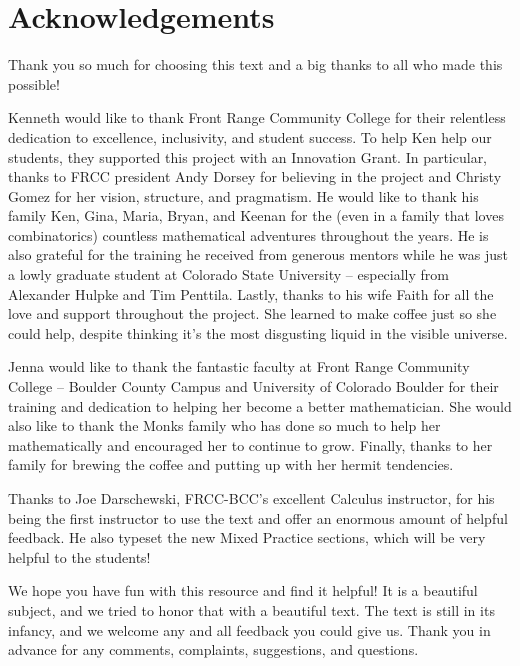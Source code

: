 

\chapter*{Acknowledgements}
\thispagestyle{empty}

Thank you so much for choosing this text and a big thanks to all who made this possible!

Kenneth would like to thank Front Range Community College for their relentless dedication to excellence, inclusivity, and student success. To help Ken help our students, they supported this project with an Innovation Grant. In particular, thanks to FRCC president Andy Dorsey for believing in the project and Christy Gomez for her vision, structure, and pragmatism.  He would like to thank his family Ken, Gina, Maria, Bryan, and Keenan for the (even in a family that loves combinatorics) countless mathematical adventures throughout the years.  He is also grateful for the training he received from generous mentors while he was just a lowly graduate student at Colorado State University -- especially from Alexander Hulpke and Tim Penttila.  Lastly, thanks to his wife Faith for all the love and support throughout the project. She learned to make coffee just so she could help, despite thinking it's the most disgusting liquid in the visible universe.  

Jenna would like to thank the fantastic faculty at Front Range Community College -- Boulder County Campus and University of Colorado Boulder for their training and dedication to helping her become a better mathematician.
She would also like to thank the Monks family who has done so much to help her mathematically and encouraged her to continue to grow.
Finally, thanks to her family for brewing the coffee and putting up with her hermit tendencies.


Thanks to Joe Darschewski, FRCC-BCC's excellent Calculus instructor, for his being the first instructor to use the text and offer an enormous amount of helpful feedback.  He also typeset the new Mixed Practice sections, which will be very helpful to the students!

We hope you have fun with this resource and find it helpful!  It is a beautiful subject, and we tried to honor that with a beautiful text.  The text is still in its infancy, and we welcome any and all feedback you could give us.  Thank you in advance for any comments, complaints, suggestions, and questions. \\

